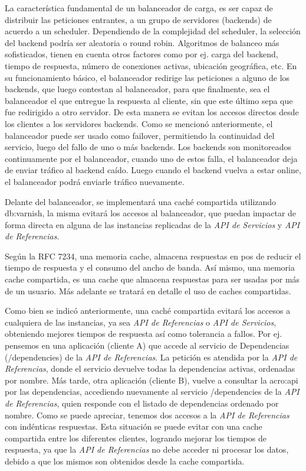 La característica fundamental de un balanceador de carga, es ser capaz de distribuir las peticiones entrantes, a un grupo de servidores (backends) de acuerdo a un scheduler.  Dependiendo de la complejidad del scheduler, la selección del backend podría ser aleatoria o round robin.  Algoritmos de balanceo más sofisticados, tienen en cuenta otros factores como por ej. carga del backend, tiempo de respuesta, número de conexiones activas, ubicación geográfica, etc.
En su funcionamiento básico, el balanceador redirige las peticiones a alguno de los backends, que luego contestan al balanceador, para que finalmente, sea el balanceador el que entregue la respuesta al cliente, sin que este último sepa que fue redirigido a otro servidor.  De esta manera se evitan los accesos directos desde los clientes a los servidores backends.
Como se mencionó anteriormente, el balanceador puede ser usado como failover, permitiendo la continuidad del servicio, luego del fallo de uno o más backends.  Los backends son monitoreados continuamente por el balanceador, cuando uno de estos falla, el balanceador deja de enviar tráfico al backend caído.  Luego cuando el backend vuelva a estar online, el balanceador podrá enviarle tráfico nuevamente.

Delante del balanceador, se implementará una caché compartida utilizando \gls{db:varnish}, la misma evitará los accesos al balanceador, que puedan impactar de forma directa en alguna de las instancias replicadas de la \textit{API de Servicios} y \textit{API de Referencias}.

Según la RFC 7234, una memoria cache, almacena respuestas en pos de reducir el tiempo de respuesta y el consumo del ancho de banda. Así mismo, una memoria cache compartida, es una cache que almacena respuestas para ser usadas por más de un usuario. Más adelante se tratará en detalle el uso de caches compartidas.

Como bien se indicó anteriormente, una caché compartida evitará los accesos a cualquiera de las instancias, ya sea \textit{API de Referencias} o \textit{API de Servicios}, obteniendo mejores tiempos de respuesta así como tolerancia a fallos.  Por ej. pensemos en una aplicación (cliente A) que accede al servicio de Dependencias (/dependencies) de la \textit{API de Referencias}.  La petición es atendida por la \textit{API de Referencias}, donde el servicio devuelve todas la dependencias activas, ordenadas por nombre.  Más tarde, otra aplicación (cliente B), vuelve a consultar la \gls{acro:api} por las dependencias, accediendo nuevamente al servicio /dependencies de la \textit{API de Referencias}, quien responde con el listado de dependencias ordenado por nombre.  Como se puede apreciar, tenemos dos accesos a la \textit{API de Referencias} con indénticas respuestas.  Esta situación se puede evitar con una cache compartida entre los diferentes clientes, logrando mejorar los tiempos de respuesta, ya que la \textit{API de Referencias} no debe acceder ni procesar los datos, debido a que los mismos son obtenidos desde la cache compartida.


